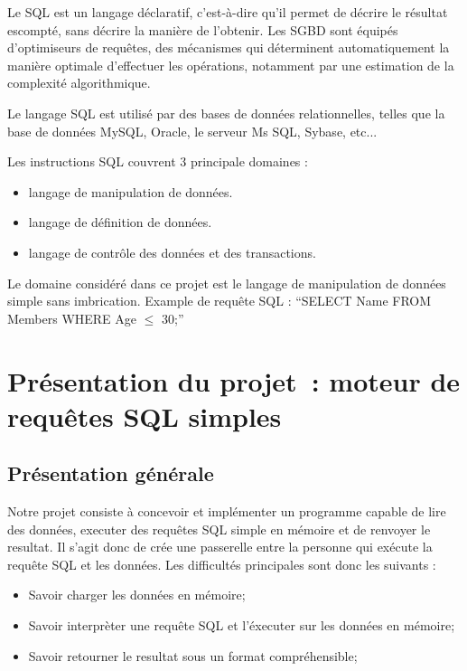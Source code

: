 \documentclass[oneside,13pt,a4paper]{report}
\begin{document}
Le SQL est un langage déclaratif, c'est-à-dire qu'il permet de décrire le résultat escompté, sans décrire la manière de l'obtenir.
Les SGBD sont équipés d'optimiseurs de requêtes, des mécanismes qui déterminent automatiquement la manière optimale d'effectuer les opérations,
notamment par une estimation de la complexité algorithmique.

Le langage SQL est utilisé par des bases de données relationnelles, telles que la base de données MySQL, Oracle, le serveur Ms SQL, Sybase, etc...

Les instructions SQL couvrent 3 principale domaines :
\begin{itemize}
	\item langage de manipulation de données.
	\item langage de définition de données.
	\item langage de contrôle des données et des transactions.
\end{itemize}
\vspace{0.3cm}

Le domaine considéré dans ce projet est le langage de manipulation de données simple sans imbrication.
Example de requête SQL : \enquote{SELECT Name FROM Members WHERE Age $ \leq $ 30;}


\chapter{Présentation du projet : moteur de requêtes SQL simples}

\section{Présentation générale}

Notre projet consiste à concevoir et implémenter un programme capable de lire des données, executer des requêtes SQL simple en mémoire et de renvoyer le resultat.
Il s’agit donc de crée une passerelle entre la personne qui exécute la requête SQL et les données.
Les difficultés principales sont donc les suivants :
\vspace{0.3cm}
\begin{itemize}
	\item Savoir charger les données en mémoire;
	\item Savoir interprèter une requête SQL et l'éxecuter sur les données en mémoire;
	\item Savoir retourner le resultat sous un format compréhensible;
\end{itemize}
\vspace{0.3cm}
\end{document}
